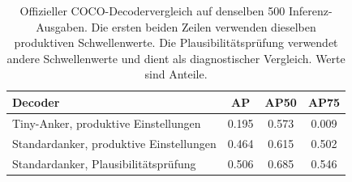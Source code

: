 \begin{table}[htbp]
\centering\small\TableSetup
\caption{Offizieller COCO-Decodervergleich auf denselben 500 Inferenz-Ausgaben. Die ersten beiden Zeilen verwenden dieselben produktiven Schwellenwerte. Die Plausibilitätsprüfung verwendet andere Schwellenwerte und dient als diagnostischer Vergleich. Werte sind Anteile.}
\label{tab:evaluation:yolov7_decoder_ab}
\begin{tabularx}{\linewidth}{@{}Y S[table-format=1.3] S[table-format=1.3] S[table-format=1.3]@{}}
\toprule
\textbf{Decoder} & {\textbf{AP}} & {\textbf{AP50}} & {\textbf{AP75}} \\
\midrule
Tiny-Anker, produktive Einstellungen & 0.195 & 0.573 & 0.009 \\
Standardanker, produktive Einstellungen & 0.464 & 0.615 & 0.502 \\
Standardanker, Plausibilitätsprüfung & 0.506 & 0.685 & 0.546 \\
\bottomrule
\end{tabularx}
\end{table}
